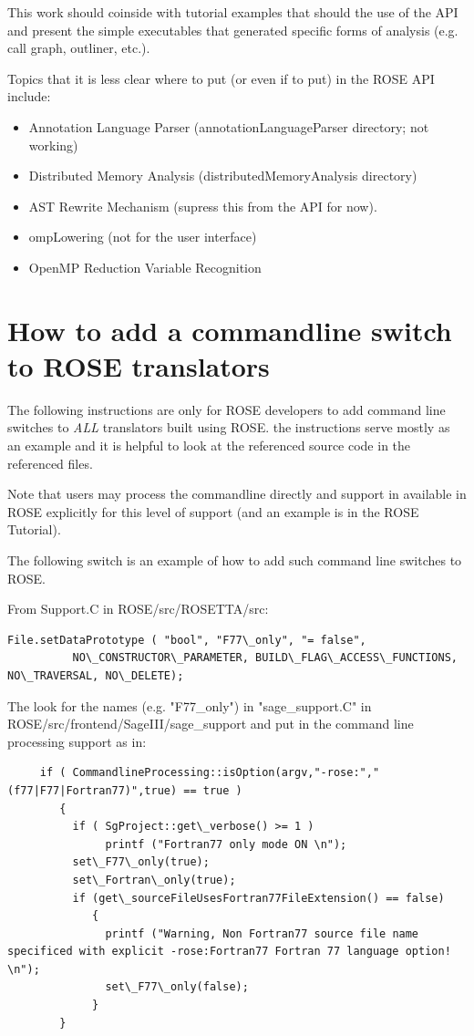 This work should coinside with tutorial examples
that should the use of the API and present the
simple executables that generated specific 
forms of analysis (e.g. call graph, outliner, etc.).

Topics that it is less clear where to put (or even if
to put) in the ROSE API include:
\begin{itemize}
   \item Annotation Language Parser (annotationLanguageParser directory; not working)
   \item Distributed Memory Analysis (distributedMemoryAnalysis directory)
   \item AST Rewrite Mechanism (supress this from the API for now).
   \item ompLowering (not for the user interface)
   \item OpenMP Reduction Variable Recognition
\end{itemize}


\newpage

\section{How to add a commandline switch to ROSE translators}
   The following instructions are only for ROSE developers to add 
command line switches to {\em ALL} translators built using ROSE.
the instructions serve mostly as an example and it is helpful to look
at the referenced source code in the referenced files.

Note that users may process the commandline directly and support in
available in ROSE explicitly for this level of support (and an example is
in the ROSE Tutorial).

The following switch is an example of how to add such command line switches to ROSE.

From Support.C in ROSE/src/ROSETTA/src:
{
\indent
\begin{verbatim}
File.setDataPrototype ( "bool", "F77\_only", "= false",
          NO\_CONSTRUCTOR\_PARAMETER, BUILD\_FLAG\_ACCESS\_FUNCTIONS, NO\_TRAVERSAL, NO\_DELETE);
\end{verbatim} 
}

The look for the names (e.g. "F77\_only") in "sage\_support.C" in ROSE/src/frontend/SageIII/sage\_support
and put in the command line processing support as in:
{
\indent
\begin{verbatim}
     if ( CommandlineProcessing::isOption(argv,"-rose:","(f77|F77|Fortran77)",true) == true )
        {
          if ( SgProject::get\_verbose() >= 1 )
               printf ("Fortran77 only mode ON \n");
          set\_F77\_only(true);
          set\_Fortran\_only(true);
          if (get\_sourceFileUsesFortran77FileExtension() == false)
             {
               printf ("Warning, Non Fortran77 source file name specificed with explicit -rose:Fortran77 Fortran 77 language option! \n");
               set\_F77\_only(false);
             }
        }
\end{verbatim} 
}

